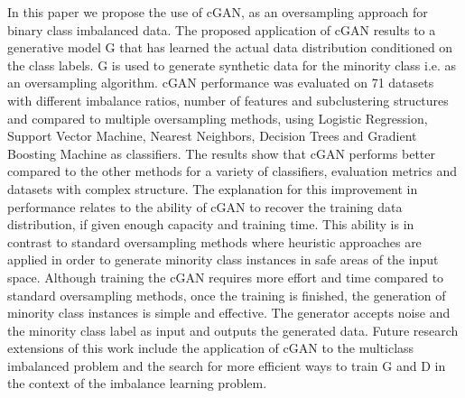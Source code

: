 \documentclass[parskip=full]{scrartcl}
\begin{document}
In this paper we propose the use of cGAN, as an oversampling approach for binary
class imbalanced data. The proposed application of cGAN results to a generative
model G that has learned the actual data distribution conditioned on the class
labels. G is used to generate synthetic data for the minority class i.e. as an
oversampling algorithm. cGAN performance was evaluated on 71 datasets with
different imbalance ratios, number of features and subclustering structures and
compared to multiple oversampling methods, using Logistic Regression, Support
Vector Machine, Nearest Neighbors, Decision Trees and Gradient Boosting Machine
as classifiers. The results show that cGAN performs better compared to the other
methods for a variety of classifiers, evaluation metrics and datasets with
complex structure. The explanation for this improvement in performance relates
to the ability of cGAN to recover the training data distribution, if given
enough capacity and training time. This ability is in contrast to standard
oversampling methods where heuristic approaches are applied in order to generate
minority class instances in safe areas of the input space. Although training the
cGAN requires more effort and time compared to standard oversampling methods,
once the training is finished, the generation of minority class instances is
simple and effective. The generator accepts noise and the minority class label
as input and outputs the generated data. Future research extensions of this work
include the application of cGAN to the multiclass imbalanced problem and the
search for more efficient ways to train G and D in the context of the imbalance
learning problem. 



\end{document}
